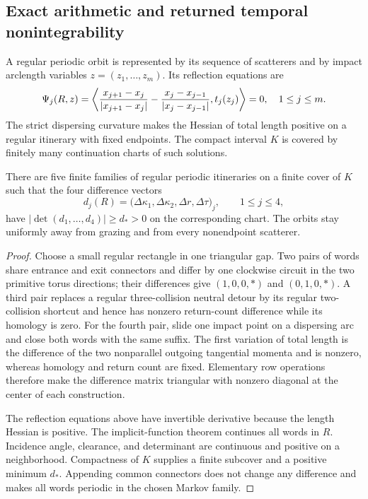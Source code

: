 \subsection{Exact arithmetic and returned temporal nonintegrability}

A regular periodic orbit is represented by its sequence of scatterers and by
impact arclength variables $z=(z_1,\ldots,z_m)$.  Its reflection equations are
\[
 \Psi_j(R,z)=
 \left\langle {x_{j+1}-x_j\over|x_{j+1}-x_j|}
             -{x_j-x_{j-1}\over|x_j-x_{j-1}|},
             t_j(z_j)\right\rangle=0,
 \quad 1\le j\le m .
\]
The strict dispersing curvature makes the Hessian of total length positive on
a regular itinerary with fixed endpoints.  The compact interval $K$ is
covered by finitely many continuation charts of such solutions.

\begin{lemma}
\label{lem:r21-a2-periodic}
There are five finite families of regular periodic itineraries on a finite
cover of $K$ such that the four difference vectors
\[
 d_j(R)=\bigl(\Delta\kappa_1,\Delta\kappa_2,
              \Delta r,\Delta\tau\bigr)_j,
 \qquad 1\le j\le4,
\]
have $|\det(d_1,\ldots,d_4)|\ge d_*>0$ on the corresponding chart.  The
orbits stay uniformly away from grazing and from every nonendpoint
scatterer.
\end{lemma}

\begin{proof}
Choose a small regular rectangle in one triangular gap.  Two pairs of words
share entrance and exit connectors and differ by one clockwise circuit in the
two primitive torus directions; their differences give $(1,0,0,*)$ and
$(0,1,0,*)$.  A third pair replaces a regular three-collision neutral detour
by its regular two-collision shortcut and hence has nonzero return-count
difference while its homology is zero.  For the fourth pair, slide one impact
point on a dispersing arc and close both words with the same suffix.  The
first variation of total length is the difference of the two nonparallel
outgoing tangential momenta and is nonzero, whereas homology and return count
are fixed.  Elementary row operations therefore make the difference matrix
triangular with nonzero diagonal at the center of each construction.

The reflection equations above have invertible derivative because the length
Hessian is positive.  The implicit-function theorem continues all words in
$R$.  Incidence angle, clearance, and determinant are continuous and positive
on a neighborhood.  Compactness of $K$ supplies a finite subcover and a
positive minimum $d_*$.  Appending common connectors does not change any
difference and makes all words periodic in the chosen Markov family.
\end{proof}

